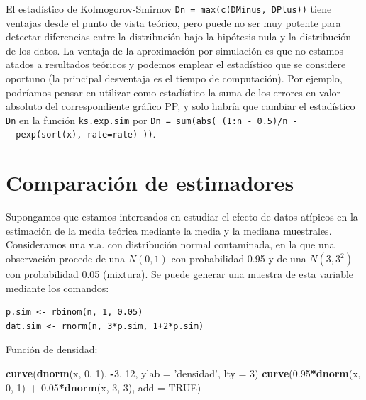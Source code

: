 \documentclass[]{book}
\newenvironment{Shaded}{\begin{snugshade}}{\end{snugshade}}
\newcommand{\KeywordTok}[1]{\textcolor[rgb]{0.13,0.29,0.53}{\textbf{#1}}}
\newcommand{\DataTypeTok}[1]{\textcolor[rgb]{0.13,0.29,0.53}{#1}}
\newcommand{\DecValTok}[1]{\textcolor[rgb]{0.00,0.00,0.81}{#1}}
\newcommand{\FloatTok}[1]{\textcolor[rgb]{0.00,0.00,0.81}{#1}}
\newcommand{\StringTok}[1]{\textcolor[rgb]{0.31,0.60,0.02}{#1}}
\newcommand{\OtherTok}[1]{\textcolor[rgb]{0.56,0.35,0.01}{#1}}
\newcommand{\OperatorTok}[1]{\textcolor[rgb]{0.81,0.36,0.00}{\textbf{#1}}}
\newcommand{\NormalTok}[1]{#1}
\theoremstyle{definition}
\theoremstyle{definition}
\theoremstyle{definition}
\theoremstyle{remark}
\let\BeginKnitrBlock\begin \let\EndKnitrBlock\end
\begin{document}
El estadístico de Kolmogorov-Smirnov
\texttt{Dn\ =\ max(c(DMinus,\ DPlus))} tiene ventajas desde el punto de
vista teórico, pero puede no ser muy potente para detectar diferencias
entre la distribución bajo la hipótesis nula y la distribución de los
datos. La ventaja de la aproximación por simulación es que no estamos
atados a resultados teóricos y podemos emplear el estadístico que se
considere oportuno (la principal desventaja es el tiempo de
computación). Por ejemplo, podríamos pensar en utilizar como estadístico
la suma de los errores en valor absoluto del correspondiente gráfico PP,
y solo habría que cambiar el estadístico \texttt{Dn} en la función
\texttt{ks.exp.sim} por
\texttt{Dn\ =\ sum(abs(\ (1:n\ -\ 0.5)/n\ -\ \ pexp(sort(x),\ rate=rate)\ ))}.

\section{Comparación de estimadores}\label{comparacion-de-estimadores}

\BeginKnitrBlock{exercise}
\protect\hypertarget{exr:unnamed-chunk-48}{}{\label{exr:unnamed-chunk-48} }
\EndKnitrBlock{exercise}

Supongamos que estamos interesados en estudiar el efecto de datos
atípicos en la estimación de la media teórica mediante la media y la
mediana muestrales. Consideramos una v.a. con distribución normal
contaminada, en la que una observación procede de una \(N(0,1)\) con
probabilidad 0.95 y de una \(N(3,3^2)\) con probabilidad 0.05 (mixtura).
Se puede generar una muestra de esta variable mediante los comandos:

\begin{verbatim}
p.sim <- rbinom(n, 1, 0.05)
dat.sim <- rnorm(n, 3*p.sim, 1+2*p.sim)
\end{verbatim}

Función de densidad:

\begin{Shaded}
\begin{Highlighting}[]
\KeywordTok{curve}\NormalTok{(}\KeywordTok{dnorm}\NormalTok{(x, }\DecValTok{0}\NormalTok{, }\DecValTok{1}\NormalTok{), }\OperatorTok{-}\DecValTok{3}\NormalTok{, }\DecValTok{12}\NormalTok{, }\DataTypeTok{ylab =} \StringTok{'densidad'}\NormalTok{, }\DataTypeTok{lty =} \DecValTok{3}\NormalTok{)}
\KeywordTok{curve}\NormalTok{(}\FloatTok{0.95}\OperatorTok{*}\KeywordTok{dnorm}\NormalTok{(x, }\DecValTok{0}\NormalTok{, }\DecValTok{1}\NormalTok{) }\OperatorTok{+}\StringTok{ }\FloatTok{0.05}\OperatorTok{*}\KeywordTok{dnorm}\NormalTok{(x, }\DecValTok{3}\NormalTok{, }\DecValTok{3}\NormalTok{), }\DataTypeTok{add =} \OtherTok{TRUE}\NormalTok{)}
\end{Highlighting}
\end{Shaded}
\end{document}
